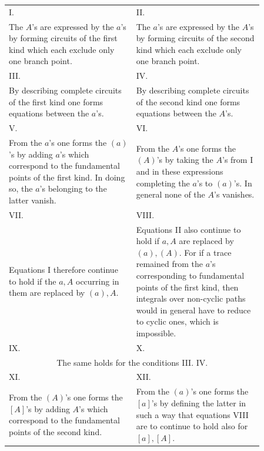 \documentclass[10pt]{article}
\begin{document}
\begin{center}
\scriptsize
\begin{tabular}{p{0.43\linewidth}|p{0.43\linewidth}}
\centering I. & \centering II.\tabularnewline
The \(A\)'s are expressed by the \(a\)'s by forming circuits of the first kind which each exclude only one branch point. &
The \(a\)'s are expressed by the \(A\)'s by forming circuits of the second kind which each exclude only one branch point.\tabularnewline[0.6em]
\centering III. & \centering IV.\tabularnewline
By describing complete circuits of the first kind one forms equations between the \(a\)'s. &
By describing complete circuits of the second kind one forms equations between the \(A\)'s.\tabularnewline[0.6em]
\centering V. & \centering VI.\tabularnewline
From the \(a\)'s one forms the \((a)\)'s by adding \(a\)'s which correspond to the fundamental points of the first kind. In doing so, the \(a\)'s belonging to the latter vanish. &
From the \(A\)'s one forms the \((A)\)'s by taking the \(A\)'s from I and in these expressions completing the \(a\)'s to \((a)\)'s. In general none of the \(A\)'s vanishes.\tabularnewline[0.6em]
\centering VII. & \centering VIII.\tabularnewline
Equations I therefore continue to hold if the \(a,A\) occurring in them are replaced by \((a),A\). &
Equations II also continue to hold if \(a,A\) are replaced by \((a),(A)\). For if a trace remained from the \(a\)'s corresponding to fundamental points of the first kind, then integrals over non-cyclic paths would in general have to reduce to cyclic ones, which is impossible.\tabularnewline[0.6em]
\centering IX. & \centering X.\tabularnewline
\multicolumn{2}{c}{The same holds for the conditions III. IV.}\tabularnewline[0.6em]
\centering XI. & \centering XII.\tabularnewline
From the \((A)\)'s one forms the \([A]\)'s by adding \(A\)'s which correspond to the fundamental points of the second kind. &
From the \((a)\)'s one forms the \([a]\)'s by defining the latter in such a way that equations VIII are to continue to hold also for \([a],[A]\).
\end{tabular}
\end{center}
\end{document}
